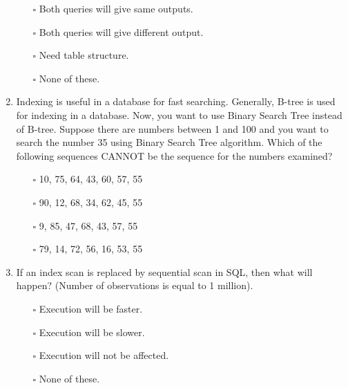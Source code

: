 \documentclass[10pt]{article}
\begin{document}
\begin{enumerate}
				\begin{enumerate}
					\item[$\square$] Both queries will give same outputs.
					\item[$\square$] Both queries will give different output.
					\item[$\square$] Need table structure.
					\item[$\square$] None of these.
				\end{enumerate}

			\item Indexing is useful in a database for fast searching. Generally, B-tree is used for indexing in a database. Now, you want to use Binary Search Tree instead of B-tree. Suppose there are numbers between 1 and 100 and you want to search the number 35 using Binary Search Tree algorithm. Which of the following sequences CANNOT be the sequence for the numbers examined?
				\begin{enumerate}
					\item[$\square$] 10, 75, 64, 43, 60, 57, 55
					\item[$\square$] 90, 12, 68, 34, 62, 45, 55
					\item[$\square$] 9, 85, 47, 68, 43, 57, 55
					\item[$\square$] 79, 14, 72, 56, 16, 53, 55
				\end{enumerate}
			
			\item If an index scan is replaced by sequential scan in SQL, then what will happen? (Number of observations is equal to 1 million).
				\begin{enumerate}
					\item[$\square$] Execution will be faster.
					\item[$\square$] Execution will be slower.
					\item[$\square$] Execution will not be affected.
					\item[$\square$] None of these.
				\end{enumerate}


\end{enumerate}
\end{document}
